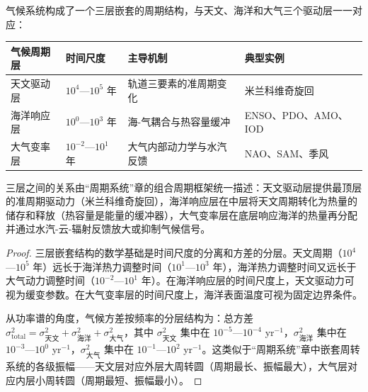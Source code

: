 \begin{theorem}[气候系统的三层嵌套周期结构]\label{thm:climate_nested_periods}
气候系统构成了一个三层嵌套的周期结构，与天文、海洋和大气三个驱动层一一对应：

\begin{center}
\begin{tabular}{>{\centering\arraybackslash}p{2.2cm}>{\centering\arraybackslash}p{2.2cm}>{\centering\arraybackslash}p{3.2cm}>{\centering\arraybackslash}p{2.2cm}}
\toprule
气候周期层 & 时间尺度 & 主导机制 & 典型实例 \\
\midrule
天文驱动层 & $10^4$—$10^5$ 年 & 轨道三要素的准周期变化 & 米兰科维奇旋回 \\
海洋响应层 & $10^0$—$10^3$ 年 & 海-气耦合与热容量缓冲 & ENSO、PDO、AMO、IOD \\
大气变率层 & $10^{-2}$—$10^1$ 年 & 大气内部动力学与水汽反馈 & NAO、SAM、季风 \\
\bottomrule
\end{tabular}
\end{center}

三层之间的关系由“周期系统”章的组合周期框架统一描述：天文驱动层提供最顶层的准周期驱动力（米兰科维奇旋回），海洋响应层在中层将天文周期转化为热量的储存和释放（热容量是能量的缓冲器），大气变率层在底层响应海洋的热量再分配并通过水汽-云-辐射反馈放大或抑制气候信号。
\end{theorem}

\begin{proof}
三层嵌套结构的数学基础是时间尺度的分离和方差的分层。天文周期（$10^4$—$10^5$ 年）远长于海洋热力调整时间（$10^1$—$10^3$ 年），海洋热力调整时间又远长于大气动力调整时间（$10^{-2}$—$10^1$ 年）。在海洋响应层的时间尺度上，天文驱动力可视为缓变参数。在大气变率层的时间尺度上，海洋表面温度可视为固定边界条件。

从功率谱的角度，气候方差按频率的分层结构为：总方差 $\sigma^2_{\text{total}} = \sigma^2_{\text{天文}} + \sigma^2_{\text{海洋}} + \sigma^2_{\text{大气}}$，其中 $\sigma^2_{\text{天文}}$ 集中在 $10^{-5}$—$10^{-4}$ yr$^{-1}$，$\sigma^2_{\text{海洋}}$ 集中在 $10^{-3}$—$10^0$ yr$^{-1}$，$\sigma^2_{\text{大气}}$ 集中在 $10^{-1}$—$10^2$ yr$^{-1}$。这类似于“周期系统”章中嵌套周转系统的各级振幅——天文层对应外层大周转圆（周期最长、振幅最大），大气层对应内层小周转圆（周期最短、振幅最小）。
\end{proof}

